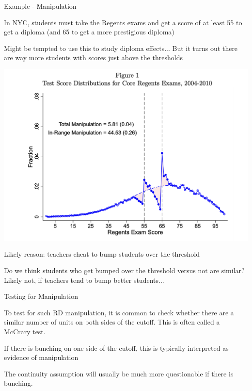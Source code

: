 \documentclass[11pt,english,handout]{beamer}
\newenvironment{wideitemize}{\itemize\addtolength{\itemsep}{10pt}}{\enditemize}
\begin{document}
\begin{frame}{Example - Manipulation}
	\begin{wideitemize}
		\item
		In NYC, students must take the Regents exams and get a score of at least 55 to get a diploma (and 65 to get a more prestigious diploma)
		
		\pause
		\item
		Might be tempted to use this to study diploma effects... But it turns out there are way more students with scores just above the thresholds
		\begin{center}
		\includegraphics[width = 0.5 \linewidth]{regents-discontinuity}
		\end{center}
		
		\pause
		\item
		Likely reason: teachers cheat to bump students over the threshold
		
		\pause
		\item
		Do we think students who get bumped over the threshold versus not are similar? \pause{} Likely not, if teachers tend to bump better students...
	\end{wideitemize}
\end{frame}

\begin{frame}{Testing for Manipulation}
	\begin{wideitemize}
		\item
		To test for such RD manipulation, it is common to check whether there are a similar number of units on both sides of the cutoff. This is often called a McCrary test.
		
		\item
		If there is bunching on one side of the cutoff, this is typically interpreted as evidence of manipulation
		
		\item
		The continuity assumption will usually be much more questionable if there is bunching.
	\end{wideitemize}
\end{frame}
\end{document}
